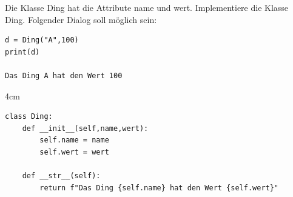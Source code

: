 \question[3]
Die Klasse Ding hat die Attribute name und wert. Implementiere die Klasse
Ding. Folgender Dialog soll möglich sein:

\begin{lstlisting}
d = Ding("A",100)
print(d)

Das Ding A hat den Wert 100
\end{lstlisting}

\begin{solutionbox}{4cm}
\begin{lstlisting}
class Ding:
    def __init__(self,name,wert):
        self.name = name
        self.wert = wert

    def __str__(self):
        return f"Das Ding {self.name} hat den Wert {self.wert}"
\end{lstlisting}
\end{solutionbox}
